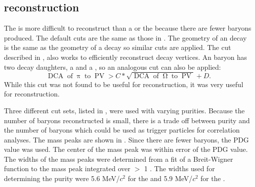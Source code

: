 \subsection{\myomega reconstruction}

The \myomega is more difficult to reconstruct than a \vzero or the \myxi because there are fewer \myomega baryons produced.  The default cuts are the same as those in .  The geometry of an \myomega decay is the same as the geometry of a \myxi decay so similar cuts are applied.  The cut described in , also works to efficiently reconstruct \myomega decay vertices.  An \myomega baryon has two decay daughters, a \lam and a \kminus, so an analogous cut can also be applied:
\begin{equation}
\operatorname{DCA} \operatorname{of} \operatorname{\pi} \operatorname{to} \operatorname{PV} > C*\sqrt{ \operatorname{DCA} \operatorname{of} \operatorname{\Omega} \operatorname{to} \operatorname{PV}}+D.\label{omegacut}
\end{equation}
While this cut was not found to be useful for \myxi reconstruction, it was very useful for \myomega reconstruction.

Three different cut sets, listed in , were used with varying purities.  Because the number of \myomega baryons reconstructed is small, there is a trade off between purity and the number of \myomega baryons which could be used as trigger particles for correlation analyses.  The mass peaks are shown in .  Since there are fewer \myomega baryons, the PDG value was used.  The center of the mass peak was within error of the PDG value.  The widths of the mass peaks were determined from a fit of a Breit-Wigner function to the mass peak integrated over \pT $>$ 1 \GeV.  The widths used for determining the purity were 5.6 MeV/$c^2$ for the \omegabary and 5.9 MeV/$c^2$ for the \aomegabary.

